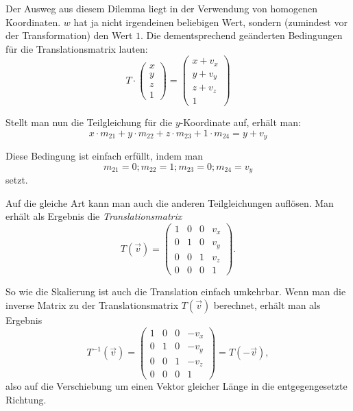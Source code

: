 Der Ausweg aus diesem Dilemma liegt in der Verwendung von homogenen Koordinaten. $w$ hat ja nicht irgendeinen beliebigen Wert, sondern (zumindest vor der Transformation) den Wert $1$. Die dementsprechend geänderten Bedingungen für die Translationsmatrix lauten:
\begin{equation}
 T \cdot 
 \begin{pmatrix}
  x \\
  y \\
  z \\
  1
 \end{pmatrix}
 =
 \begin{pmatrix}
  x + v_x \\
  y + v_y \\
  z + v_z \\
  1
 \end{pmatrix}
\end{equation}

Stellt man nun die Teilgleichung für die $y$-Koordinate auf, erhält man:
\begin{equation}
 x \cdot m_{21} + y \cdot m_{22} + z \cdot m_{23} + 1 \cdot m_{24} = y + v_y
\end{equation}

Diese Bedingung ist einfach erfüllt, indem man
\begin{equation}
 m_{21} = 0; m_{22} = 1; m_{23} = 0; m_{24} = v_y
\end{equation}
setzt.

Auf die gleiche Art kann man auch die anderen Teilgleichungen auflösen. Man erhält als Ergebnis die \emph{Translationsmatrix}
\begin{equation}
 T{(\vec v)} =
 \begin{pmatrix}
  1 & 0 & 0 & v_x \\
  0 & 1 & 0 & v_y \\
  0 & 0 & 1 & v_z \\
  0 & 0 & 0 & 1
 \end{pmatrix}.
\end{equation}

So wie die Skalierung ist auch die Translation einfach umkehrbar. Wenn man die inverse Matrix zu der Translationsmatrix $T{(\vec v)}$ berechnet, erhält man als Ergebnis
\begin{equation}
 T^{-1}{(\vec v)} =
 \begin{pmatrix}
  1 & 0 & 0 & -v_x \\
  0 & 1 & 0 & -v_y \\
  0 & 0 & 1 & -v_z \\
  0 & 0 & 0 & 1
 \end{pmatrix} = T{(-\vec v)},
\end{equation}
also auf die Verschiebung um einen Vektor gleicher Länge in die entgegengesetzte Richtung.


